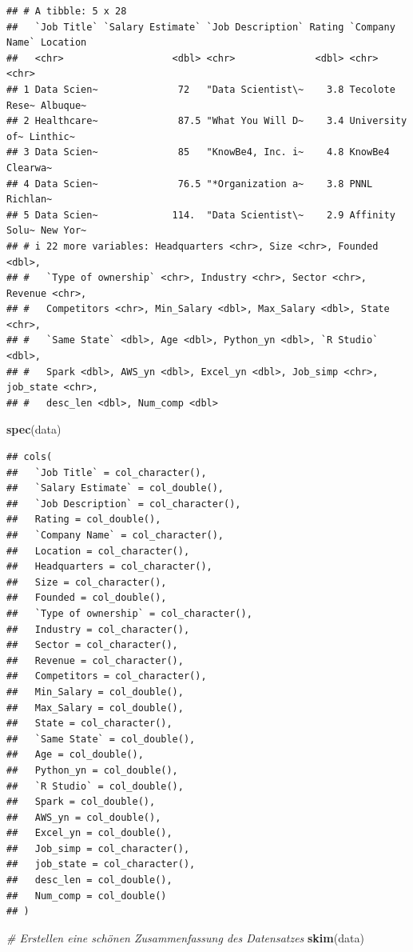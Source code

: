 \documentclass[
]{article}
\newenvironment{Shaded}{\begin{snugshade}}{\end{snugshade}}
\newcommand{\CommentTok}[1]{\textcolor[rgb]{0.56,0.35,0.01}{\textit{#1}}}
\newcommand{\FunctionTok}[1]{\textcolor[rgb]{0.13,0.29,0.53}{\textbf{#1}}}
\newcommand{\NormalTok}[1]{#1}
\begin{document}
\begin{verbatim}
## # A tibble: 5 x 28
##   `Job Title` `Salary Estimate` `Job Description` Rating `Company Name` Location
##   <chr>                   <dbl> <chr>              <dbl> <chr>          <chr>   
## 1 Data Scien~              72   "Data Scientist\~    3.8 Tecolote Rese~ Albuque~
## 2 Healthcare~              87.5 "What You Will D~    3.4 University of~ Linthic~
## 3 Data Scien~              85   "KnowBe4, Inc. i~    4.8 KnowBe4        Clearwa~
## 4 Data Scien~              76.5 "*Organization a~    3.8 PNNL           Richlan~
## 5 Data Scien~             114.  "Data Scientist\~    2.9 Affinity Solu~ New Yor~
## # i 22 more variables: Headquarters <chr>, Size <chr>, Founded <dbl>,
## #   `Type of ownership` <chr>, Industry <chr>, Sector <chr>, Revenue <chr>,
## #   Competitors <chr>, Min_Salary <dbl>, Max_Salary <dbl>, State <chr>,
## #   `Same State` <dbl>, Age <dbl>, Python_yn <dbl>, `R Studio` <dbl>,
## #   Spark <dbl>, AWS_yn <dbl>, Excel_yn <dbl>, Job_simp <chr>, job_state <chr>,
## #   desc_len <dbl>, Num_comp <dbl>
\end{verbatim}

\begin{Shaded}
\begin{Highlighting}[]
\FunctionTok{spec}\NormalTok{(data)}
\end{Highlighting}
\end{Shaded}

\begin{verbatim}
## cols(
##   `Job Title` = col_character(),
##   `Salary Estimate` = col_double(),
##   `Job Description` = col_character(),
##   Rating = col_double(),
##   `Company Name` = col_character(),
##   Location = col_character(),
##   Headquarters = col_character(),
##   Size = col_character(),
##   Founded = col_double(),
##   `Type of ownership` = col_character(),
##   Industry = col_character(),
##   Sector = col_character(),
##   Revenue = col_character(),
##   Competitors = col_character(),
##   Min_Salary = col_double(),
##   Max_Salary = col_double(),
##   State = col_character(),
##   `Same State` = col_double(),
##   Age = col_double(),
##   Python_yn = col_double(),
##   `R Studio` = col_double(),
##   Spark = col_double(),
##   AWS_yn = col_double(),
##   Excel_yn = col_double(),
##   Job_simp = col_character(),
##   job_state = col_character(),
##   desc_len = col_double(),
##   Num_comp = col_double()
## )
\end{verbatim}

\begin{Shaded}
\begin{Highlighting}[]
\CommentTok{\# Erstellen eine schönen Zusammenfassung des Datensatzes}
\FunctionTok{skim}\NormalTok{(data)}
\end{Highlighting}
\end{Shaded}
\end{document}
